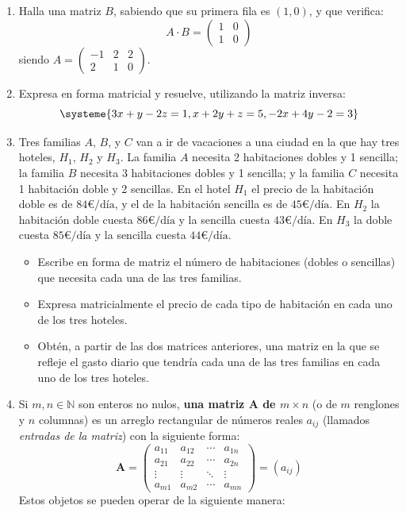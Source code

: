 \documentclass[8pt,a4paper]{article}
\begin{document}
\begin{enumerate}
		\item Halla una matriz $B$, sabiendo que su primera fila es $(1, 0)$, y que verifica:
%
			\[A\cdot B=\begin{pmatrix}
						1 & 0 \\
						1 & 0
						\end{pmatrix}\]
siendo $\displaystyle A=\begin{pmatrix} -1 & 2 & 2 \\ 2 & 1 & 0 \end{pmatrix}$.

		\item Expresa en forma matricial y resuelve, utilizando la matriz inversa:
%
			\[ \systeme{3x+y-2z=1,x+2y+z=5,-2x+4y-2=3} \]
%
		\item Tres familias $A$, $B$, y $C$ van a ir de vacaciones a una ciudad en la que hay tres hoteles, $H_1$, $H_2$ y $H_3$. La familia $A$ necesita 2 habitaciones dobles y 1 sencilla; la familia $B$ necesita 3 habitaciones dobles y 1 sencilla; y la familia $C$ necesita 1 habitación doble y 2 sencillas. En el hotel $H_1$ el precio de la habitación doble es de $84 €/\text{día}$, y el de la habitación sencilla es de $45 €/\text{día}$. En $H_2$ la habitación doble cuesta $86 €/\text{día}$ y la sencilla cuesta $43 €/\text{día}$. En $H_3$ la doble cuesta $85 €/\text{día}$ y la sencilla cuesta $44 €/\text{día}$.
		
		\begin{itemize}
			\item Escribe en forma de matriz el número de habitaciones (dobles o sencillas) que necesita cada una de las tres familias.
			\item Expresa matricialmente el precio de cada tipo de habitación en cada uno de los tres hoteles.
			\item Obtén, a partir de las dos matrices anteriores, una matriz en la que se refleje el gasto diario que tendría cada una de las tres familias en cada uno de los tres hoteles.
		\end{itemize}

		\item Si $m,n\in\mathbb{N}$ son enteros no nulos, \textbf{una matriz $\mathbf{A}$ de $m\times n$} (o de $m$ renglones y $n$ columnas) es un arreglo rectangular de números reales $a_{ij}$ (llamados \textit{entradas de la matriz}) con la siguiente forma:
%		
			\[\mathbf{A}=\begin{pmatrix}
							a_{11} & a_{12} & \cdots & a_{1n} \\
							a_{21} & a_{22} & \cdots & a_{2n} \\
							\vdots & \vdots & \ddots & \vdots \\
							a_{m1} & a_{m2} & \cdots & a_{mn}
						\end{pmatrix}=\left(a_{ij}\right)\]
%
	Estos objetos se pueden operar de la siguiente manera:
	

\end{enumerate}
\end{document}
